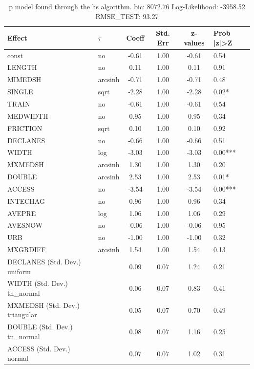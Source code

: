\begin{table}
	\caption{p model found through the hs algorithm. bic: 8072.76 Log-Likelihood: -3958.52 RMSE_TEST: 93.27}
	\begin{center}
		\begin{tabular}{|l|l|c|c|c|l|}
			\hline
			Effect & $\tau$ & Coeff & Std. Err & z-values & Prob |z|>Z \\
			\hline
			const & no & -0.61 & 1.00 & -0.61 & 0.54 \\
			\hline
			LENGTH & no & 0.11 & 1.00 & 0.11 & 0.91 \\
			\hline
			MIMEDSH & arcsinh & -0.71 & 1.00 & -0.71 & 0.48 \\
			\hline
			SINGLE & sqrt & -2.28 & 1.00 & -2.28 & 0.02* \\
			\hline
			TRAIN & no & -0.61 & 1.00 & -0.61 & 0.54 \\
			\hline
			MEDWIDTH & no & 0.95 & 1.00 & 0.95 & 0.34 \\
			\hline
			FRICTION & sqrt & 0.10 & 1.00 & 0.10 & 0.92 \\
			\hline
			DECLANES & no & -0.66 & 1.00 & -0.66 & 0.51 \\
			\hline
			WIDTH & log & -3.03 & 1.00 & -3.03 & 0.00*** \\
			\hline
			MXMEDSH & arcsinh & 1.30 & 1.00 & 1.30 & 0.20 \\
			\hline
			DOUBLE & arcsinh & 2.53 & 1.00 & 2.53 & 0.01* \\
			\hline
			ACCESS & no & -3.54 & 1.00 & -3.54 & 0.00*** \\
			\hline
			INTECHAG & no & 0.96 & 1.00 & 0.96 & 0.34 \\
			\hline
			AVEPRE & log & 1.06 & 1.00 & 1.06 & 0.29 \\
			\hline
			AVESNOW & no & -0.06 & 1.00 & -0.06 & 0.95 \\
			\hline
			URB & no & -1.00 & 1.00 & -1.00 & 0.32 \\
			\hline
			MXGRDIFF & arcsinh & 1.54 & 1.00 & 1.54 & 0.13 \\
			\hline
			DECLANES (Std. Dev.) uniform &  & 0.09 & 0.07 & 1.24 & 0.21 \\
			\hline
			WIDTH (Std. Dev.) tn_normal &  & 0.06 & 0.07 & 0.83 & 0.41 \\
			\hline
			MXMEDSH (Std. Dev.) triangular &  & 0.05 & 0.07 & 0.70 & 0.49 \\
			\hline
			DOUBLE (Std. Dev.) tn_normal &  & 0.08 & 0.07 & 1.16 & 0.25 \\
			\hline
			ACCESS (Std. Dev.) normal &  & 0.07 & 0.07 & 1.02 & 0.31 \\

\end{tabular}
\end{center}
\end{table}
